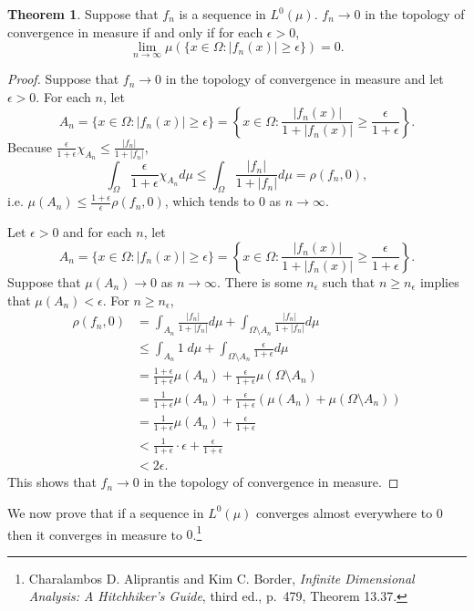 \documentclass{article}
\theoremstyle{definition}
\newtheorem{theorem}{Theorem}
\theoremstyle{definition}
\begin{document}
\begin{theorem}
Suppose that  $f_n$ is  a sequence in $L^0(\mu)$.  $f_n \to 0$ in the topology of convergence
in measure if and only if for each $\epsilon>0$,
\[
\lim_{n \to \infty} \mu\left( \{x \in \Omega: |f_n(x)| \geq \epsilon \} \right) = 0.
\]
\end{theorem}
\begin{proof}
Suppose that $f_n \to 0$ in the topology of convergence in measure and let
$\epsilon>0$. For each $n$,
let
\[
A_n = \{x \in \Omega: |f_n(x)| \geq \epsilon\}=
\left\{ x \in \Omega: \frac{|f_n(x)|}{1+|f_n(x)|} \geq \frac{\epsilon}{1+\epsilon}\right\}.
\]
Because $\frac{\epsilon}{1+\epsilon} \chi_{A_n} \leq 
\frac{|f_n|}{1+|f_n|}$, 
\[
\int_\Omega \frac{\epsilon}{1+\epsilon} \chi_{A_n} d\mu
\leq \int_\Omega \frac{|f_n|}{1+|f_n|} d\mu
=\rho(f_n,0),
\]
i.e. $\mu(A_n) \leq \frac{1+\epsilon}{\epsilon} \rho(f_n,0)$, which tends to
$0$ as $n \to \infty$. 

Let $\epsilon>0$ and for each $n$, let
\[
A_n = \{x \in \Omega: |f_n(x)| \geq \epsilon\}=
\left\{ x \in \Omega: \frac{|f_n(x)|}{1+|f_n(x)|} \geq \frac{\epsilon}{1+\epsilon}\right\}.
\]
Suppose that $\mu(A_n) \to 0$ as $n \to \infty$. There is some $n_\epsilon$ such
that $n \geq n_\epsilon$ implies that $\mu(A_n)<\epsilon$. For $n \geq n_\epsilon$,
\begin{align*}
\rho(f_n,0)&=\int_{A_n} \frac{|f_n|}{1+|f_n|} d\mu
+\int_{\Omega \setminus A_n} \frac{|f_n|}{1+|f_n|} d\mu\\
&\leq \int_{A_n} 1 \; d\mu + \int_{\Omega \setminus A_n} \frac{\epsilon}{1+\epsilon} d\mu\\
&=\frac{1+\epsilon}{1+\epsilon} \mu(A_n)+\frac{\epsilon}{1+\epsilon} \mu(\Omega \setminus A_n)\\
&=\frac{1}{1+\epsilon} \mu(A_n) + \frac{\epsilon}{1+\epsilon} (\mu(A_n)+\mu(\Omega \setminus A_n))\\
&=\frac{1}{1+\epsilon} \mu(A_n)+\frac{\epsilon}{1+\epsilon}\\
&<\frac{1}{1+\epsilon}\cdot \epsilon+\frac{\epsilon}{1+\epsilon}\\
&<2\epsilon.
\end{align*}
This shows that $f_n \to 0$ in the topology of convergence in measure.
\end{proof}


We now prove that if a sequence in
$L^0(\mu)$ converges almost everywhere to $0$ then
it converges in measure to $0$.\footnote{Charalambos D. 
Aliprantis and Kim C. Border, {\em Infinite Dimensional Analysis: A Hitchhiker's Guide}, third ed., p.~479,
Theorem 13.37.} 
\end{document}
